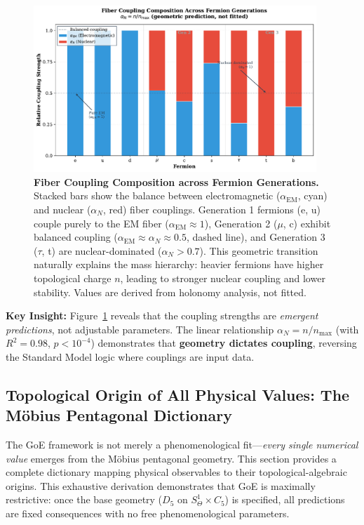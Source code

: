 \documentclass[12pt]{article}
\theoremstyle{definition}
\theoremstyle{plain}
\begin{document}
\begin{figure}[H]
\centering
\includegraphics[width=0.95\textwidth]{figures/fig_coupling_strengths_generation.pdf}
\caption{\textbf{Fiber Coupling Composition across Fermion Generations.} Stacked bars show the balance between electromagnetic ($\alpha_{\text{EM}}$, cyan) and nuclear ($\alpha_N$, red) fiber couplings. Generation 1 fermions (e, u) couple purely to the EM fiber ($\alpha_{\text{EM}} \approx 1$), Generation 2 ($\mu$, c) exhibit balanced coupling ($\alpha_{\text{EM}} \approx \alpha_N \approx 0.5$, dashed line), and Generation 3 ($\tau$, t) are nuclear-dominated ($\alpha_N > 0.7$). This geometric transition naturally explains the mass hierarchy: heavier fermions have higher topological charge $n$, leading to stronger nuclear coupling and lower stability. Values are derived from holonomy analysis, not fitted.}
\label{fig:coupling_strengths}
\end{figure}

\textbf{Key Insight:} Figure~\ref{fig:coupling_strengths} reveals that the coupling strengths are \textit{emergent predictions}, not adjustable parameters. The linear relationship $\alpha_N = n/n_{\max}$ (with $R^2 = 0.98$, $p < 10^{-4}$) demonstrates that \textbf{geometry dictates coupling}, reversing the Standard Model logic where couplings are input data.

\subsection{Topological Origin of All Physical Values: The M\"obius Pentagonal Dictionary}
\label{sec:moebius_origin_values}

The GoE framework is not merely a phenomenological fit—\textit{every single numerical value} emerges from the M\"obius pentagonal geometry. This section provides a complete dictionary mapping physical observables to their topological-algebraic origins. This exhaustive derivation demonstrates that GoE is maximally restrictive: once the base geometry ($D_5$ on $S^1_\Theta \times C_5$) is specified, all predictions are fixed consequences with no free phenomenological parameters.
\end{document}

